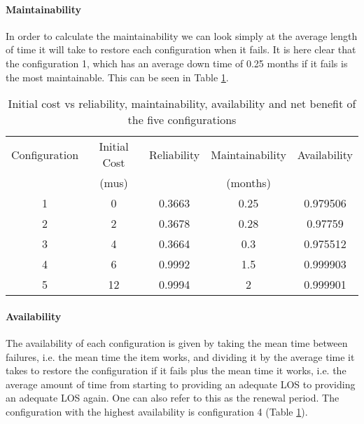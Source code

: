\paragraph{Maintainability}
In order to calculate the maintainability we can look simply at the average
length of time it will take to restore each configuration when it fails. It is
here clear that the configuration 1, which has an average down time of 0.25
months if it fails is the most maintainable. This can be seen in Table
\ref{tblavaimain:5}.
\begin{table}[h]
\caption{Initial cost vs reliability, maintainability, availability and net benefit of the five
configurations}
\begin{tabular}{|l|l|l|l|l|}
\hline
\multicolumn{1}{|c|}{Configuration} & \multicolumn{1}{c|}{Initial Cost} & \multicolumn{1}{c|}{Reliability} & \multicolumn{1}{c|}{Maintainability} & \multicolumn{1}{c|}{Availability} \\ 
\multicolumn{1}{|c|}{} & \multicolumn{1}{c|}{(mus)} & \multicolumn{1}{c|}{} & \multicolumn{1}{c|}{(months)} & \multicolumn{1}{c|}{} \\ 
\hline
\multicolumn{1}{|c|}{1} & \multicolumn{1}{c|}{0} & \multicolumn{1}{c|}{0.3663} & \multicolumn{1}{c|}{\cellcolor{blue!25} 0.25} & \multicolumn{1}{c|}{0.979506} \\ 
\hline
\multicolumn{1}{|c|}{2} & \multicolumn{1}{c|}{2} & \multicolumn{1}{c|}{0.3678} & \multicolumn{1}{c|}{0.28} & \multicolumn{1}{c|}{0.97759} \\ 
\hline
\multicolumn{1}{|c|}{3} & \multicolumn{1}{c|}{4} & \multicolumn{1}{c|}{0.3664} & \multicolumn{1}{c|}{0.3} & \multicolumn{1}{c|}{0.975512} \\ 
\hline
\multicolumn{1}{|c|}{4} & \multicolumn{1}{c|}{6} & \multicolumn{1}{c|}{0.9992} & \multicolumn{1}{c|}{1.5} & \multicolumn{1}{c|}{\cellcolor{blue!25}0.999903} \\ 
\hline
\multicolumn{1}{|c|}{5} & \multicolumn{1}{c|}{12} & \multicolumn{1}{c|}{\cellcolor{blue!25} 0.9994} & \multicolumn{1}{c|}{2} & \multicolumn{1}{c|}{0.999901} \\ 
\hline
\end{tabular}
\label{tblavaimain:5}
\end{table}
\paragraph{Availability}
The availability of each configuration is given by taking the mean time between
failures, i.e. the mean time the item works, and dividing it by the average time
it takes to restore the configuration if it fails plus the mean time it works,
i.e. the average amount of time from starting to providing an adequate LOS to
providing an adequate LOS again. One can also refer to this as the renewal
period. The configuration with the highest availability is configuration 4 (Table
\ref{tblavaimain:5}).

